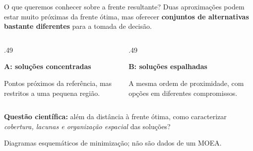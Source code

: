 \begin{frame}{O que queremos conhecer sobre a frente resultante?}
Duas aproximações podem estar muito próximas da frente ótima, mas oferecer \textbf{conjuntos de alternativas bastante diferentes} para a tomada de decisão.
\begin{columns}[T,onlytextwidth]
\begin{column}{.49\textwidth}\centering
{}
\textbf{A: soluções concentradas}\par
\scriptsize Pontos próximos da referência, mas restritos a uma pequena região.
\end{column}
\begin{column}{.49\textwidth}\centering
{}
\textbf{B: soluções espalhadas}\par
\scriptsize A mesma ordem de proximidade, com opções em diferentes compromissos.
\end{column}
\end{columns}
\vspace{.16cm}
\textbf{Questão científica:} além da distância à frente ótima, como caracterizar \emph{cobertura, lacunas e organização espacial} das soluções?
\par{\scriptsize Diagramas esquemáticos de minimização; não são dados de um MOEA.}
\end{frame}

